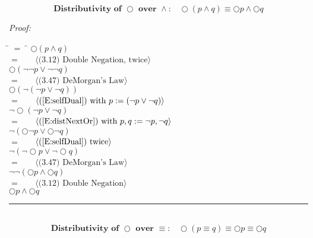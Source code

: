\documentclass[fleqn, leqno]{article}
\newcommand{\lgap}{2pt}                             %
\newcommand{\mymathindent}{24pt}                      %
\newcommand{\next}{\bigcirc}
\newcommand{\myqed}{\hfill\rule[-.23ex]{1.2ex}{2.0ex}}
\newcommand{\Gll} {\langle}                         %
\newcommand{\Ggg} {\rangle}                         %
\newcommand{\Hint}[1]     {\ \ \ $\Gll              \mbox{#1} \Ggg$ }   %
\begin{document}
\begin{equation}\label{E:distNextAnd}
\textbf{Distributivity of $\next$ over $\land$:}\quad \next (p \land q) \equiv \next p \land \next q
\end{equation}


\emph{Proof:}
\begin{tabbing}
\hspace{\mymathindent} \= $= \;$ \= \kill
  \> \>   $\next (p \land q)$\\[\lgap]
  \> $=$  \>  \Hint{(3.12) Double Negation, twice}\\[\lgap]
  \> \>   $\next (\lnot\lnot p \lor \lnot\lnot q)$\\[\lgap]
  \> $=$  \>  \Hint{(3.47) DeMorgan's Law}\\[\lgap]
  \> \>   $\next (\lnot(\lnot p \lor \lnot q))$\\[\lgap]
  \> $=$  \>  \Hint{(\ref{E:selfDual}) with $p:= (\lnot p \lor \lnot q$)}\\[\lgap]
  \> \>   $\lnot\next (\lnot p \lor \lnot q)$\\[\lgap]
  \> $=$  \>  \Hint{(\ref{E:distNextOr}) with $p,q := \lnot p, \lnot q$}\\[\lgap]
  \> \>   $\lnot (\next\lnot p \lor \next \lnot q)$\\[\lgap]
  \> $=$  \>  \Hint{(\ref{E:selfDual}) twice}\\[\lgap]
  \> \>   $\lnot(\lnot\next p \lor \lnot\next q)$\\[\lgap]
  \> $=$  \>  \Hint{(3.47) DeMorgan's Law}\\[\lgap]
  \> \>   $\lnot\lnot(\next p \land \next q)$\\[\lgap]
  \> $=$  \>  \Hint{(3.12) Double Negation}\\[\lgap]
  \> \>   $\next p \land \next q$\\[\lgap]
\end{tabbing}
\myqed\\[\lgap]


\begin{equation}\label{E:distNextEquiv}
\textbf{Distributivity of $\next$ over $\equiv$:}\quad \next (p \equiv q) \equiv \next p \equiv \next q
\end{equation}
\end{document}
